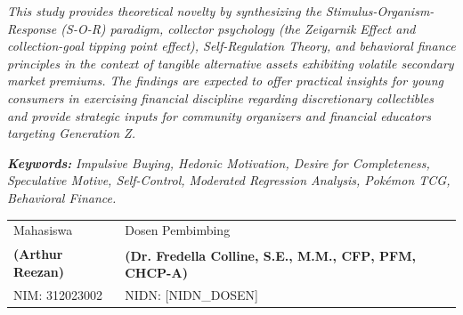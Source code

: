 \documentclass[12pt,a4paper]{article}
\numberwithin{equation}{section}
\numberwithin{table}{section}
\numberwithin{figure}{section}
\newcommand{\namamahasiswa}{Arthur Reezan}
\newcommand{\nim}{312023002}
\newcommand{\dosbim}{Dr. Fredella Colline, S.E., M.M., CFP\textsuperscript{\textregistered}, PFM, CHCP-A}
\newcommand{\nidn}{[NIDN\_DOSEN]}
\begin{document}
\begin{singlespace}
\emph{This study provides theoretical novelty by synthesizing the Stimulus-Organism-Response (S-O-R) paradigm, collector psychology (the Zeigarnik Effect and collection-goal tipping point effect), Self-Regulation Theory, and behavioral finance principles in the context of tangible alternative assets exhibiting volatile secondary market premiums. The findings are expected to offer practical insights for young consumers in exercising financial discipline regarding discretionary collectibles and provide strategic inputs for community organizers and financial educators targeting Generation Z.}

\vspace{0.2cm}
\noindent\textbf{\emph{Keywords:}} \emph{Impulsive Buying, Hedonic Motivation, Desire for Completeness, Speculative Motive, Self-Control, Moderated Regression Analysis, Pok\'emon TCG, Behavioral Finance.}

\vspace{0.35cm}
\noindent
\begin{tabular}{@{}p{6.6cm} p{6.6cm}@{}}
  Mahasiswa & Dosen Pembimbing \\[1.1cm]
  \textbf{(\namamahasiswa)} & \textbf{(\dosbim)} \\
  NIM: \nim & NIDN: \nidn
\end{tabular}
\end{singlespace}

\newpage
\thispagestyle{frontmatter}
\renewcommand{\contentsname}{DAFTAR ISI}
\tableofcontents
{}

\newpage
\thispagestyle{frontmatter}
\renewcommand{\listtablename}{DAFTAR TABEL}
\listoftables
{}

\newpage
\thispagestyle{frontmatter}
\renewcommand{\listfigurename}{DAFTAR GAMBAR}
\listoffigures
{}

\newpage
{}
\pagestyle{fancy}
\end{document}
